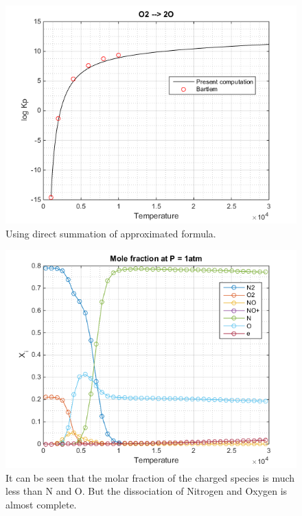 \documentclass[]{aelab_aiaa-tc}%
\begin{document}
\begin{figure}[h]%
	\includegraphics{KpO2fig}
	\caption{Using direct summation of approximated formula.}
	\end{figure}

\begin{figure}[h]%
	\includegraphics{comp1atmfig}
	\caption{It can be seen that the molar fraction of the charged species is much less than N and O. But the dissociation of Nitrogen and Oxygen is almost complete.}
	\end{figure}
\end{document}
